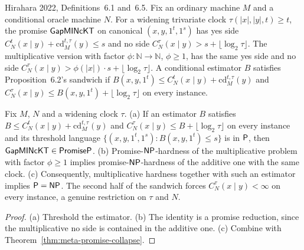 \begin{definition}
  \label{def:avg-gapminckt}
  \leanok
  Hirahara 2022, Definitions~6.1 and~6.5. Fix an ordinary machine $M$ and a
  conditional oracle machine $N$. For a widening trivariate clock
  $\tau(|x|, |y|, t) \ge t$, the promise $\mathsf{GapMINcKT}$ on canonical
  $(x, y, 1^t, 1^s)$ has yes side $C^t_N(x \mid y) + \mathrm{cd}^{t,\tau}_M(y)
  \le s$ and no side $C^{\tau}_N(x \mid y) > s + \lfloor \log_2 \tau \rfloor$.
  The multiplicative version with factor $\phi \colon \mathbb{N} \to
  \mathbb{N}$, $\phi \ge 1$, has the same yes side and no side
  $C^{\tau}_N(x \mid y) > \phi(|x|) \cdot s + \lfloor \log_2 \tau \rfloor$. A
  conditional estimator $B$ satisfies Proposition~6.2's sandwich if $B(x, y,
  1^t) \le C^t_N(x \mid y) + \mathrm{cd}^{t,\tau}_M(y)$ and $C^{\tau}_N(x \mid
  y) \le B(x, y, 1^t) + \lfloor \log_2 \tau \rfloor$ on every instance.
\end{definition}

\begin{theorem}
  \label{thm:avg-gapminckt-estimator}
  \leanok
  Fix $M$, $N$ and a widening clock $\tau$. (a) If an estimator $B$ satisfies
  $B \le C^t_N(x \mid y) + \mathrm{cd}^{t,\tau}_M(y)$ and $C^{\tau}_N(x \mid y)
  \le B + \lfloor \log_2 \tau \rfloor$ on every instance and its threshold
  language $\{(x, y, 1^t, 1^s) : B(x, y, 1^t) \le s\}$ is in $\mathsf{P}$, then
  $\mathsf{GapMINcKT} \in \mathsf{PromiseP}$. (b) Promise-$\mathsf{NP}$-hardness of the
  multiplicative problem with factor $\phi \ge 1$ implies promise-$\mathsf{NP}$-hardness
  of the additive one with the same clock. (c) Consequently, multiplicative
  hardness together with such an estimator implies $\mathsf{P} = \mathsf{NP}$. The
  second half of the sandwich forces $C^{\tau}_N(x \mid y) < \infty$ on every
  instance, a genuine restriction on $\tau$ and $N$.
\end{theorem}
\begin{proof}
  \leanok
  (a) Threshold the estimator. (b) The identity is a promise reduction, since the
  multiplicative no side is contained in the additive one. (c) Combine with
  Theorem~\ref{thm:meta-promise-collapse}.
\end{proof}

